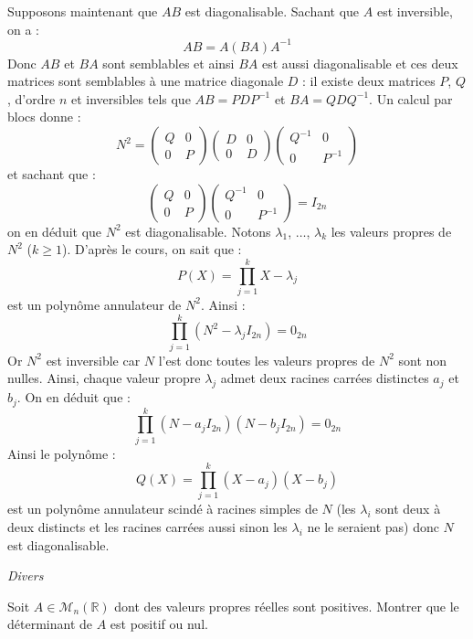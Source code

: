\documentclass[a4paper,10pt]{report}
\begin{document}
\begin{enumerate}
\medskip

\noindent Supposons maintenant que $AB$ est diagonalisable. Sachant que $A$ est inversible, on a :
$$ AB=A(BA)A^{-1}$$
Donc $AB$ et $BA$ sont semblables et ainsi $BA$ est aussi diagonalisable et ces deux matrices sont semblables à une matrice diagonale $D$ : il existe deux matrices $P$, $Q$, d'ordre $n$ et inversibles tels que $AB=PDP^{-1}$ et $BA= QDQ^{-1}$. Un calcul par blocs donne :
$$ N^2 = \begin{pmatrix}
Q & 0 \\
0 & P
\end{pmatrix} \begin{pmatrix}
D & 0 \\
0 & D
\end{pmatrix} \begin{pmatrix}
Q^{-1} & 0 \\
0 & P^{-1}
\end{pmatrix}$$
et sachant que :
$$ \begin{pmatrix}
Q & 0 \\
0 & P
\end{pmatrix} \begin{pmatrix}
Q^{-1} & 0 \\
0 & P^{-1}
\end{pmatrix} = I_{2n}$$
on en déduit que $N^2$ est diagonalisable. Notons $\lambda_1$, $\ldots$, $\lambda_k$ les valeurs propres de $N^2$ ($k \geq 1$). D'après le cours, on sait que :
$$ P(X) = \prod_{j=1}^k X- \lambda_j$$
est un polynôme annulateur de $N^2$. Ainsi :
$$ \prod_{j=1} ^k (N^2- \lambda_j I_{2n}) = 0_{2n}$$
Or $N^2$ est inversible car $N$ l'est donc toutes les valeurs propres de $N^2$ sont non nulles. Ainsi, chaque valeur propre $\lambda_j$ admet deux racines carrées distinctes $a_j$ et $b_j$. On en déduit que :
$$ \prod_{j=1} ^k (N- a_j I_{2n})(N - b_j I_{2n}) = 0_{2n}$$
Ainsi le polynôme :
$$ Q(X) = \prod_{j=1}^k (X-a_j)(X- b_j)$$
est un polynôme annulateur scindé à racines simples de $N$ (les $\lambda_i$ sont deux à deux distincts et les racines carrées aussi sinon les $\lambda_i$ ne le seraient pas) donc $N$ est diagonalisable.
\end{enumerate}



\medskip

\begin{center}
\textit{{ {\large Divers}}}
\end{center}

\medskip

\begin{Exa} Soit $A \in \mathcal{M}_{n}(\mathbb{R})$ dont des valeurs propres réelles sont positives. Montrer que le déterminant de $A$ est positif ou nul.
\end{Exa} 
\end{document}
